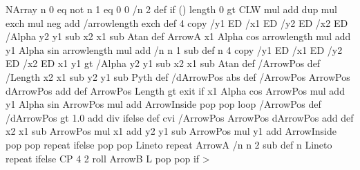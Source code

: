  NArray n 0 eq not { n 1 eq { 0 0 /n 2 def } if
  (\psk@ArrowInside) length 0 gt { 
    \ifx\psk@arrowA\arrowType@H   %
      \pst@number\pshooklength  %
    \else
      \psk@arrowsize\space CLW mul add dup \psk@arrowlength\space mul exch \psk@arrowinset mul neg add  
    \fi
    /arrowlength exch def 
    4 copy 				%
    /y1 ED /x1 ED /y2 ED /x2 ED 	%
    /Alpha y2 y1 sub x2 x1 sub Atan def %
    ArrowA 				%
    x1 Alpha cos arrowlength mul add	%
    y1 Alpha sin arrowlength mul add	%
    /n n 1 sub def
    n {
      4 copy
      /y1 ED /x1 ED /y2 ED /x2 ED
      x1 y1
      \psk@ArrowInsidePos{} gt {
        /Alpha y2 y1 sub x2 x1 sub Atan def
        /ArrowPos \psk@ArrowInsideOffset\space def
        /Length x2 x1 sub y2 y1 sub Pyth def
        /dArrowPos \psk@ArrowInsidePos\space abs def
        {
          /ArrowPos ArrowPos dArrowPos add def
          ArrowPos Length gt { exit } if
          x1 Alpha cos ArrowPos mul add
          y1 Alpha sin ArrowPos mul add
          ArrowInside
          pop pop
        } loop
      }{
        /ArrowPos \psk@ArrowInsideOffset\space def
        /dArrowPos  gt {%
          1.0  add div
        }{\psk@ArrowInsidePos } ifelse def
          \psk@ArrowInsideNo\space cvi {
            /ArrowPos ArrowPos dArrowPos add def
            x2 x1 sub ArrowPos mul x1 add
            y2 y1 sub ArrowPos mul y1 add
            ArrowInside
            pop pop
          } repeat
      } ifelse
      pop pop Lineto
    } repeat
  }{ ArrowA /n n 2 sub def n { Lineto } repeat } ifelse
  CP 4 2 roll ArrowB L pop pop } if >
%

